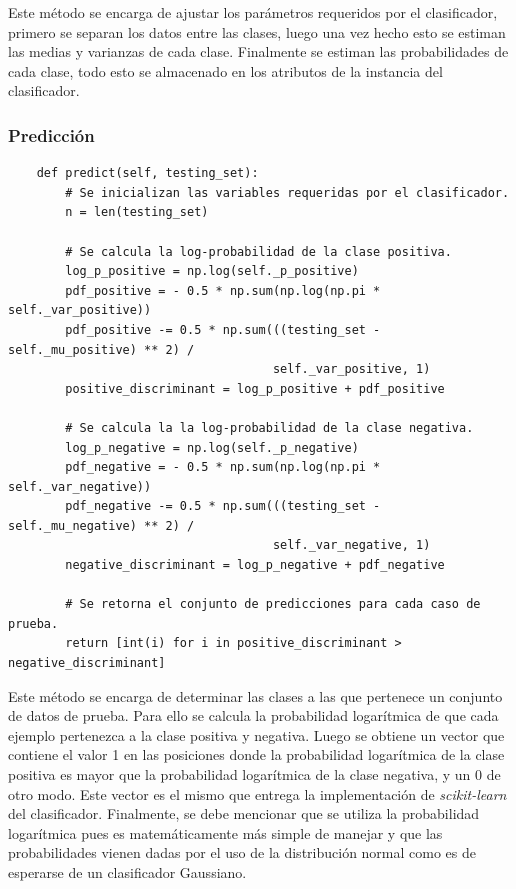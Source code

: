 \documentclass[letter, titlepage, 10pt]{article}
\begin{document}
Este método se encarga de ajustar los parámetros requeridos por el clasificador, primero se separan los datos entre las clases, luego una vez hecho esto se estiman las medias y varianzas de cada clase. Finalmente se estiman las probabilidades de cada clase, todo esto se almacenado en los atributos de la instancia del clasificador.\\

\subsubsection{Predicción}
\begin{lstlisting}
    def predict(self, testing_set):
        # Se inicializan las variables requeridas por el clasificador.
        n = len(testing_set)

        # Se calcula la log-probabilidad de la clase positiva.
        log_p_positive = np.log(self._p_positive)
        pdf_positive = - 0.5 * np.sum(np.log(np.pi * self._var_positive))
        pdf_positive -= 0.5 * np.sum(((testing_set - self._mu_positive) ** 2) /
                                     self._var_positive, 1)
        positive_discriminant = log_p_positive + pdf_positive

        # Se calcula la la log-probabilidad de la clase negativa.
        log_p_negative = np.log(self._p_negative)
        pdf_negative = - 0.5 * np.sum(np.log(np.pi * self._var_negative))
        pdf_negative -= 0.5 * np.sum(((testing_set - self._mu_negative) ** 2) /
                                     self._var_negative, 1)
        negative_discriminant = log_p_negative + pdf_negative

        # Se retorna el conjunto de predicciones para cada caso de prueba.
        return [int(i) for i in positive_discriminant > negative_discriminant]
\end{lstlisting}

Este método se encarga de determinar las clases a las que pertenece un conjunto de datos de prueba. Para ello se calcula la probabilidad logarítmica de que cada ejemplo pertenezca a la clase positiva y negativa. Luego se obtiene un vector que contiene el valor 1 en las posiciones donde la probabilidad logarítmica de la clase positiva es mayor que la probabilidad logarítmica de la clase negativa, y un 0 de otro modo. Este vector es el mismo que entrega la implementación de \textit{scikit-learn} del clasificador. Finalmente, se debe mencionar que se utiliza la probabilidad logarítmica pues es matemáticamente más simple de manejar y que las probabilidades vienen dadas por el uso de la distribución normal como es de esperarse de un clasificador Gaussiano.\\
\end{document}
